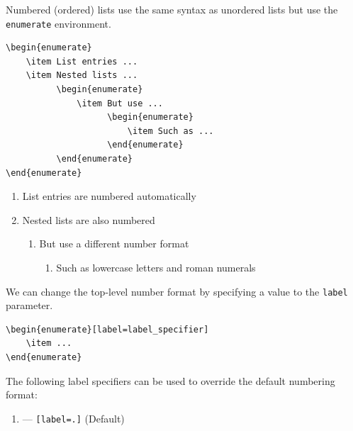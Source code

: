 \documentclass[11pt, twoside]{article}
\begin{document}
Numbered (ordered) lists use the same syntax as unordered lists but use
the \texttt{enumerate} environment.
\begin{verbatim}
\begin{enumerate}
    \item List entries ...
    \item Nested lists ...
          \begin{enumerate}
              \item But use ...
                    \begin{enumerate}
                        \item Such as ...
                    \end{enumerate}
          \end{enumerate}
\end{enumerate}
\end{verbatim}
\begin{outputbox}
    \begin{enumerate}
        \item List entries are numbered automatically
        \item Nested lists are also numbered
              \begin{enumerate}
                  \item But use a different number format
                        \begin{enumerate}
                            \item Such as lowercase letters and roman
                                  numerals
                        \end{enumerate}
              \end{enumerate}
    \end{enumerate}
\end{outputbox}
We can change the top-level number format by specifying a value to the
\texttt{label} parameter.
\begin{verbatim}
\begin{enumerate}[label=label_specifier]
    \item ...
\end{enumerate}
\end{verbatim}
The following label specifiers can be used to override the default
numbering format:
\begin{enumerate}[label=\arabic*.]
    \item --- \texttt{[label=\arabic*.]} (Default)
\end{enumerate}
\end{document}

